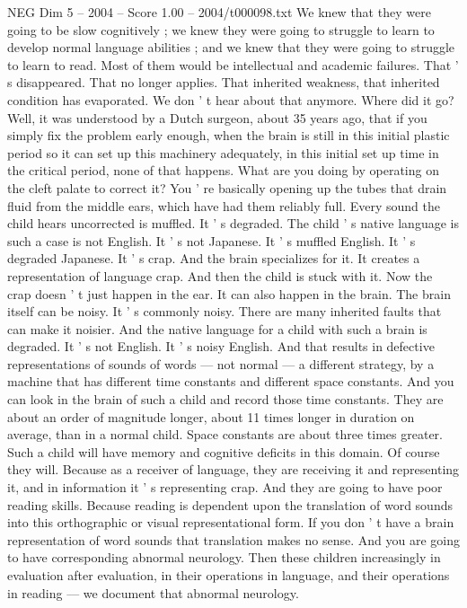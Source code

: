 \begin{textsample}{NEG Dim 5 – 2004 – Score 1.00 – 2004/t000098.txt}
We knew that they were going to be slow cognitively ; we knew they were going to struggle to learn to develop normal language abilities ; and we knew that they were going to struggle to learn to read.
Most of them would be intellectual and academic failures.
That ' s disappeared.
That no longer applies.
That inherited weakness, that inherited condition has evaporated.
We don ' t hear about that anymore.
Where did it go?
Well, it was understood by a Dutch surgeon, about 35 years ago, that if you simply fix the problem early enough, when the brain is still in this initial plastic period so it can set up this machinery adequately, in this initial set up time in the critical period, none of that happens.
What are you doing by operating on the cleft palate to correct it?
You ' re basically opening up the tubes that drain fluid from the middle ears, which have had them reliably full.
Every sound the child hears uncorrected is muffled.
It ' s degraded.
The child ' s native language is such a case is not English.
It ' s not Japanese.
It ' s muffled English.
It ' s degraded Japanese.
It ' s crap.
And the brain specializes for it.
It creates a representation of language crap.
And then the child is stuck with it.
Now the crap doesn ' t just happen in the ear.
It can also happen in the brain.
The brain itself can be noisy.
It ' s commonly noisy.
There are many inherited faults that can make it noisier.
And the native language for a child with such a brain is degraded.
It ' s not English.
It ' s noisy English.
And that results in defective representations of sounds of words — not normal — a different strategy, by a machine that has different time constants and different space constants.
And you can look in the brain of such a child and record those time constants.
They are about an order of magnitude longer, about 11 times longer in duration on average, than in a normal child.
Space constants are about three times greater.
Such a child will have memory and cognitive deficits in this domain.
Of course they will.
Because as a receiver of language, they are receiving it and representing it, and in information it ' s representing crap.
And they are going to have poor reading skills.
Because reading is dependent upon the translation of word sounds into this orthographic or visual representational form.
If you don ' t have a brain representation of word sounds that translation makes no sense.
And you are going to have corresponding abnormal neurology.
Then these children increasingly in evaluation after evaluation, in their operations in language, and their operations in reading — we document that abnormal neurology.

\end{textsample}
